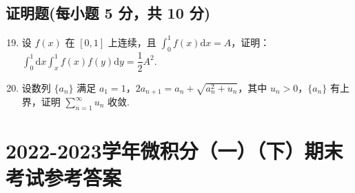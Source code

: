 \documentclass[../main.tex]{subfiles}
\begin{document}
\section{证明题(每小题 5 分，共 10 分)}

\begin{enumerate}
  \setcounter{enumi}{18}
  \item 设 \( f(x) \) 在 \([0,1]\) 上连续，且 \( \displaystyle \int_0^1 f(x) \mathrm{d}x = A \)，证明：\( \displaystyle \int_0^1 \mathrm{d}x \displaystyle \int_x^1 f(x)f(y) \mathrm{d}y = \dfrac{1}{2}A^2 \).
        \vspace{11em}

  \item 设数列 \( \{a_n\} \) 满足 \( a_1 = 1 \)，\( 2a_{n+1} = a_n + \sqrt{a_n^2 + u_n} \)，其中 \( u_n > 0 \)，\( \{a_n\} \) 有上界，证明 \( \sum \limits_{n=1}^{\infty} u_n \) 收敛.
        \vspace{11em}
\end{enumerate}
\chapter{2022-2023学年微积分（一）（下）期末考试参考答案}
\end{document}
